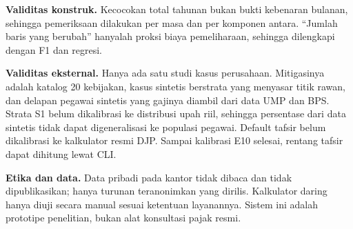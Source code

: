 \textbf{Validitas konstruk.} Kecocokan total tahunan bukan bukti kebenaran bulanan, sehingga pemeriksaan dilakukan per masa dan per komponen antara. ``Jumlah baris yang berubah'' hanyalah proksi biaya pemeliharaan, sehingga dilengkapi dengan  F1 dan regresi.

\textbf{Validitas eksternal.} Hanya ada satu studi kasus perusahaan. Mitigasinya adalah katalog 20 kebijakan, kasus sintetis berstrata yang menyasar titik rawan, dan delapan pegawai sintetis yang gajinya diambil dari data UMP dan BPS. Strata S1 belum dikalibrasi ke distribusi upah riil, sehingga persentase dari data sintetis tidak dapat digeneralisasi ke populasi pegawai. Default tafsir belum dikalibrasi ke kalkulator resmi DJP. Sampai kalibrasi E10 selesai, rentang tafsir dapat dihitung lewat CLI.

\textbf{Etika dan data.} Data pribadi pada  kantor tidak dibaca dan tidak dipublikasikan; hanya turunan teranonimkan yang dirilis. Kalkulator daring hanya diuji secara manual sesuai ketentuan layanannya. Sistem ini adalah prototipe penelitian, bukan alat konsultasi pajak resmi.
